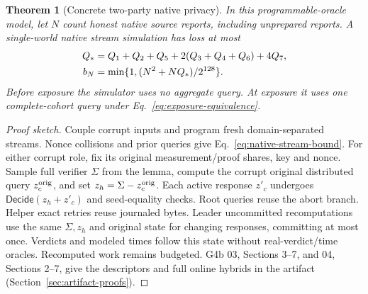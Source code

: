 \documentclass[conference,compsoc]{IEEEtran}
\theoremstyle{definition}
\numberwithin{equation}{section}
\numberwithin{table}{section}
\numberwithin{figure}{section}
\theoremstyle{plain}
\newtheorem{theorem}{Theorem}[section]
\newtheorem{theorem}{Theorem}
\begin{document}
\begin{theorem}[Concrete two-party native privacy]
\label{thm:concrete-two-party-native}
In this programmable-oracle model, let \(N\) count honest native source
reports, including unprepared reports.
A single-world native stream simulation has loss at most
\begin{align}
 Q_*&=Q_1+Q_2+Q_5+2(Q_3+Q_4+Q_6)+4Q_7,\notag\\
 b_N&=\min\{1,(N^2+NQ_*)/2^{128}\}.
 \label{eq:native-stream-bound}
\end{align}
Before exposure the simulator uses no aggregate query. At exposure it uses
one complete-cohort query under Eq.~\eqref{eq:exposure-equivalence}.
\end{theorem}
\begin{proof}[Proof sketch]
Couple corrupt inputs and program fresh domain-separated streams. Nonce
collisions and prior queries give Eq.~\eqref{eq:native-stream-bound}.
For either corrupt role, fix its original measurement/proof shares, key and
nonce. Sample full verifier \(\Sigma\) from the lemma, compute the corrupt original
distributed query \(z_c^{\rm orig}\), and set \(z_h=\Sigma-z_c^{\rm orig}\).
Each active response \(z'_c\) undergoes \(\mathsf{Decide}(z_h+z'_c)\) and
seed-equality checks. Root queries reuse the abort branch. Helper exact retries
reuse journaled bytes. Leader uncommitted recomputations use the same
\(\Sigma,z_h\) and original state for changing responses, committing at most
once. Verdicts and modeled times follow this state without real-verdict/time
oracles. Recomputed work remains budgeted. G4b 03, Sections 3--7, and 04,
Sections 2--7, give the descriptors and full online hybrids in the
artifact (Section~\ref{sec:artifact-proofs}).
\end{proof}
\end{document}
